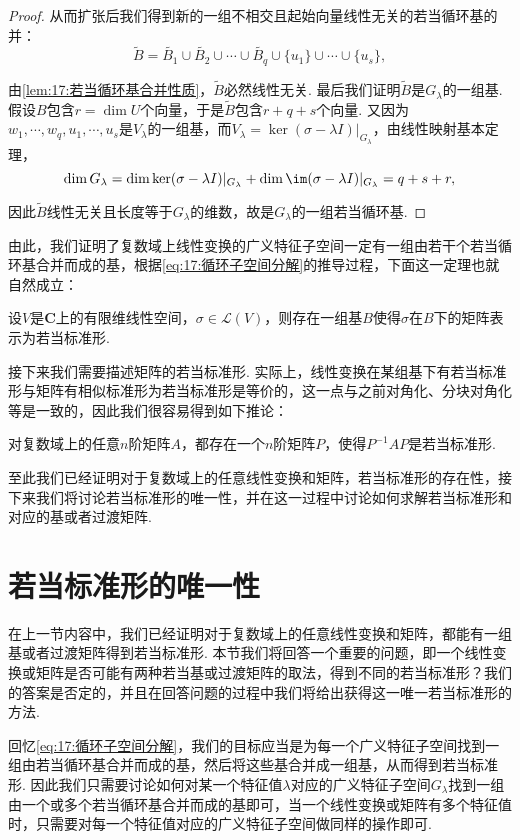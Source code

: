 \begin{proof}
    从而扩张后我们得到新的一组不相交且起始向量线性无关的若当循环基的并：
    \[\tilde{B}=\tilde{B_1}\cup\tilde{B_2}\cup\cdots\cup\tilde{B_q}\cup\{u_1\}\cup\cdots\cup\{u_s\},\]

    由\autoref{lem:17:若当循环基合并性质}，$\tilde{B}$必然线性无关. 最后我们证明$\tilde{B}$是$G_\lambda$的一组基. 假设$B$包含$r=\dim U$个向量，于是$\tilde{B}$包含$r+q+s$个向量. 又因为$w_1,\cdots,w_q,u_1,\cdots,u_s$是$V_\lambda$的一组基，而$V_\lambda=\ker(\sigma-\lambda I)\vert_{G_\lambda}$，由线性映射基本定理，
    \[\dim G_\lambda=\dim\ker(\sigma-\lambda I)\vert_{G_\lambda}+\dim\im(\sigma-\lambda I)\vert_{G_\lambda}=q+s+r,\]

    因此$\tilde{B}$线性无关且长度等于$G_\lambda$的维数，故是$G_\lambda$的一组若当循环基.
\end{proof}

由此，我们证明了复数域上线性变换的广义特征子空间一定有一组由若干个若当循环基合并而成的基，根据\autoref{eq:17:循环子空间分解}的推导过程，下面这一定理也就自然成立：
\begin{corollary} \label{cor:17:若当基存在}
    设$V$是$\mathbf{C}$上的有限维线性空间，$\sigma\in\mathcal{L}(V)$，则存在一组基$B$使得$\sigma$在$B$下的矩阵表示为若当标准形.
\end{corollary}

接下来我们需要描述矩阵的若当标准形. 实际上，线性变换在某组基下有若当标准形与矩阵有相似标准形为若当标准形是等价的，这一点与之前对角化、分块对角化等是一致的，因此我们很容易得到如下推论：
\begin{corollary}
    对复数域上的任意$n$阶矩阵$A$，都存在一个$n$阶矩阵$P$，使得$P^{-1}AP$是若当标准形.
\end{corollary}

至此我们已经证明对于复数域上的任意线性变换和矩阵，若当标准形的存在性，接下来我们将讨论若当标准形的唯一性，并在这一过程中讨论如何求解若当标准形和对应的基或者过渡矩阵.

\section{若当标准形的唯一性}

在上一节内容中，我们已经证明对于复数域上的任意线性变换和矩阵，都能有一组基或者过渡矩阵得到若当标准形. 本节我们将回答一个重要的问题，即一个线性变换或矩阵是否可能有两种若当基或过渡矩阵的取法，得到不同的若当标准形？我们的答案是否定的，并且在回答问题的过程中我们将给出获得这一唯一若当标准形的方法.

回忆\autoref{eq:17:循环子空间分解}，我们的目标应当是为每一个广义特征子空间找到一组由若当循环基合并而成的基，然后将这些基合并成一组基，从而得到若当标准形. 因此我们只需要讨论如何对某一个特征值$\lambda$对应的广义特征子空间$G_\lambda$找到一组由一个或多个若当循环基合并而成的基即可，当一个线性变换或矩阵有多个特征值时，只需要对每一个特征值对应的广义特征子空间做同样的操作即可.

